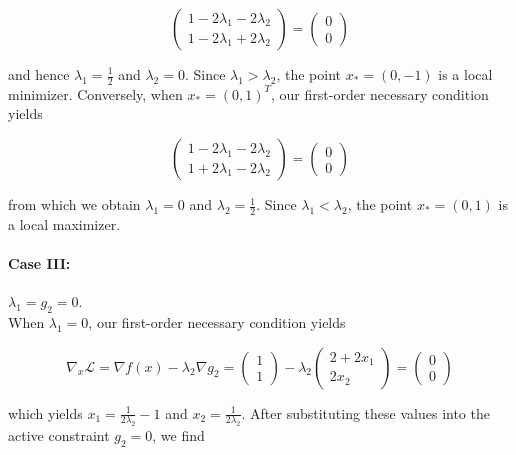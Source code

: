 \begin{solution}
    $$
    \begin{pmatrix*}
        1 - 2 \lambda_1 - 2 \lambda_2 \\
        1 - 2 \lambda_1 + 2 \lambda_2
    \end{pmatrix*} = \begin{pmatrix*}
        0 \\
        0
    \end{pmatrix*}
    $$

    and hence $\lambda_1 = \frac{1}{2}$ and $\lambda_2 = 0$. Since $\lambda_1 > \lambda_2$, the point $x_* = (0, -1)$ is
    a local minimizer. Conversely, when $x_* = (0, 1)^T$, our first-order necessary condition yields

    $$
    \begin{pmatrix*}
        1 - 2 \lambda_1 - 2 \lambda_2 \\
        1 + 2 \lambda_1 - 2 \lambda_2
    \end{pmatrix*} = \begin{pmatrix*}
        0 \\
        0
    \end{pmatrix*}
    $$

    from which we obtain $\lambda_1 = 0$ and $\lambda_2 = \frac{1}{2}$. Since $\lambda_1 < \lambda_2$, the point 
    $x_* = (0, 1)$ is a local maximizer.
    
    \paragraph{Case III:} $\lambda_1 = g_2 = 0.$ \ \\
    When $\lambda_1 = 0$, our first-order necessary condition yields

    $$
    \nabla_x \mathcal{L} = \nabla f(x) - \lambda_2 \nabla g_2 = \begin{pmatrix*}
        1 \\
        1
    \end{pmatrix*} - \lambda_2 \begin{pmatrix*}
        2 + 2 x_1 \\
        2 x_2
    \end{pmatrix*} = \begin{pmatrix*}
        0 \\
        0
    \end{pmatrix*}
    $$

    which yields $x_1 = \frac{1}{2 \lambda_2} - 1$ and $x_2 = \frac{1}{2 \lambda_2}$. After substituting these values 
    into the active constraint $g_2 = 0$, we find


\end{solution}
